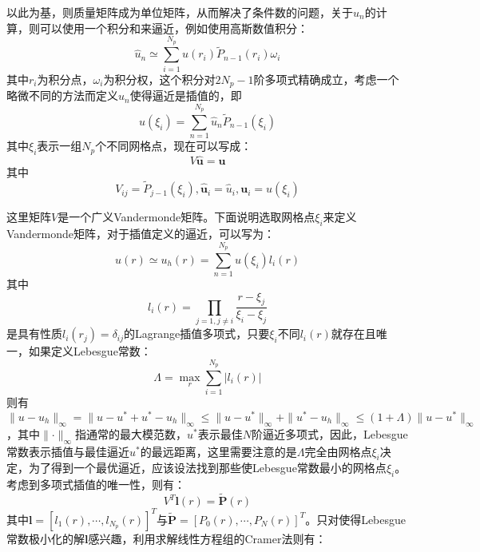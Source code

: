 \documentclass[12pt]{article}
\begin{document}
\par
以此为基，则质量矩阵成为单位矩阵，从而解决了条件数的问题，关于$\hat{u}_n$的计算，则可以使用一个积分和来逼近，例如使用高斯数值积分：
\begin{equation}\label{2-29}
\hat{u}_n \simeq \sum_{i=1}^{N_p}u(r_i)\tilde{P}_{n-1}(r_i)\omega_i
\end{equation}
其中$r_i$为积分点，$\omega_i$为积分权，这个积分对$2N_p-1$阶多项式精确成立，考虑一个略微不同的方法而定义$\hat{u}_n$使得逼近是插值的，即
\begin{equation}\label{2-30}
u(\xi_i)=\sum_{n=1}^{N_p}\hat{u}_n\tilde{P}_{n-1}(\xi_i)
\end{equation}
其中$\xi_i$表示一组$N_p$个不同网格点，现在可以写成：
\begin{equation}\label{2-31}
V\hat{\boldsymbol{u}}=\boldsymbol{u}
\end{equation}
其中
\begin{equation*}
V_{ij}=\tilde{P}_{j-1}(\xi_i),\hat{\boldsymbol{u}}_i=\hat{u}_i,\boldsymbol{u}_i=u(\xi_i)
\end{equation*}
\par
这里矩阵$V$是一个广义Vandermonde矩阵。下面说明选取网格点$\xi_i$来定义Vandermonde矩阵，对于插值定义的逼近，可以写为：
\begin{equation}\label{2-32}
u(r) \simeq u_h(r)=\sum_{n=1}^{N_p}u(\xi_i)l_i(r)
\end{equation}
其中
\begin{equation*}
l_i(r)=\prod_{j=1,j \neq i}\frac{r-\xi_j}{\xi_i-\xi_j}
\end{equation*}
是具有性质$l_i(r_j)=\delta_{ij}$的Lagrange插值多项式，只要$\xi_i$不同$l_i(r)$就存在且唯一，如果定义Lebesgue常数：
\begin{equation}\label{2-33}
\Lambda=\max_r\sum_{i=1}^{N_p}\vert l_i(r) \vert
\end{equation}
则有$\parallel u-u_h \parallel_\infty=\parallel u-u^*+u^*-u_h \parallel_\infty \le \parallel u-u^* \parallel_\infty+\parallel u^*-u_h \parallel_\infty \le (1+\Lambda)\parallel u-u^*\parallel_\infty$，其中$\parallel \cdot \parallel_\infty$指通常的最大模范数，$u^*$表示最佳$N$阶逼近多项式，因此，Lebesgue常数表示插值与最佳逼近$u^*$的最远距离，这里需要注意的是$\Lambda$完全由网格点$\xi_i$决定，为了得到一个最优逼近，应该设法找到那些使Lebesgue常数最小的网格点$\xi_i$。考虑到多项式插值的唯一性，则有：
\begin{equation}\label{2-34}
V^T \boldsymbol{l}(r)=\tilde{\boldsymbol{P}}(r)
\end{equation}
其中$\boldsymbol{l}=[l_1(r),\cdots,l_{N_p}(r)]^T$与$\tilde{\boldsymbol{P}}=[P_0(r),\cdots,P_N(r)]^T$。只对使得Lebesgue常数极小化的解$\boldsymbol{l}$感兴趣，利用求解线性方程组的Cramer法则有：
\end{document}

